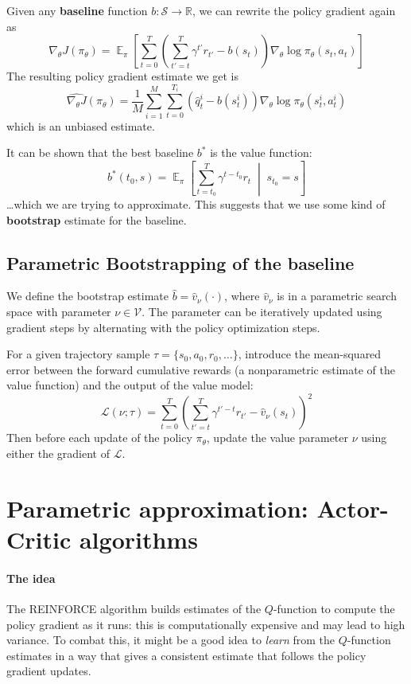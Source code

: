 \documentclass[12pt]{report}
\newcommand\RR{\mathbb{R}}
\newcommand{\scalemid}{\;\middle|\;}
\DeclareMathOperator{\EE}{\mathbb{E}}
\newcommand{\calS}{\mathcal{S}}
\newcommand{\calL}{\mathcal{L}}
\newcommand{\bluefont}{\color{Blue}}
\begin{document}
Given any \textbf{\bluefont baseline} function $b\colon \calS \to \RR$, we can rewrite the policy gradient again as
\begin{equation}
	\nabla_\theta J(\pi_\theta) =
	\EE_\pi \left[
	\sum_{t=0}^T
	\left(
		\sum_{t'=t}^T \gamma^{t'} r_{t'} - b(s_t)
	\right)
	\nabla_\theta \log\pi_\theta(s_t, a_t)
	\right]
\end{equation}
The resulting policy gradient estimate we get is
\begin{equation}\label{eq:MCPolicyGradBaseline}
	\widehat{\nabla_\theta J}(\pi_\theta) =
	\frac{1}{M}\sum_{i=1}^M
	\sum_{t=0}^{T_i}
	\left(
		\hat{q}^i_t - b(s^i_t)
	\right)
	\nabla_\theta \log\pi_\theta (s_t^i, a_t^i)
\end{equation}
which is an unbiased estimate.

It can be shown that the best baseline $b^*$ is the value function:
\[
	b^*(t_0, s) = \EE_\pi\left[\sum_{t=t_0}^T \gamma^{t-t_0} r_t \scalemid s_{t_0} = s\right]
\]
\ldots which we are trying to approximate. This suggests that we use some kind of \textbf{bootstrap} estimate for the baseline.



\subsection{Parametric Bootstrapping of the baseline}

We define the bootstrap estimate $\hat{b} = \hat{v}_\nu(\cdot)$, where $\hat{v}_\nu$ is in a parametric search space with parameter $\nu \in \mathcal{V}$. The parameter can be iteratively updated using gradient steps by alternating with the policy optimization steps.

For a given trajectory sample $\tau=\{s_0,a_0,r_0,\ldots\}$, introduce the mean-squared error between the forward cumulative rewards (a nonparametric estimate of the value function) and the output of the value model:
\[
	\calL(\nu; \tau) =
	\sum_{t=0}^{T} \left(
	\sum_{t'=t}^{T}
	\gamma^{t'-t} r_{t'}
	- \hat{v}_\nu(s_t)
	\right)^2
\]
Then before each update of the policy $\pi_\theta$, update the value parameter $\nu$ using either the gradient of $\calL$.



\section{Parametric approximation: Actor-Critic algorithms}


\paragraph{The idea} The REINFORCE algorithm builds estimates of the $Q$-function to compute the policy gradient as it runs: this is computationally expensive and may lead to high variance. To combat this, it might be a good idea to \textit{learn} from the $Q$-function estimates in a way that gives a consistent estimate that follows the policy gradient updates.
\end{document}
